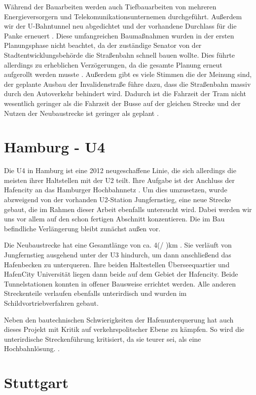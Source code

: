 Während der Bauarbeiten werden auch Tiefbauarbeiten von mehreren
Energieversorgern und Telekomunikationsunternemen
durchgeführt. Außerdem wir der U-Bahntunnel neu abgedichtet und
der vorhandene Durchlass für die Panke
erneuert \cite{flyerInvalidestr}. Diese umfangreichen Baumaßnahmen
wurden in der ersten Planungsphase nicht beachtet, da der zuständige
Senator von der Stadtentwicklungsbehörde die Straßenbahn schnell bauen
wollte. Dies führte allerdings zu erheblichen Verzögerungen, da die
gesamte Planung erneut aufgerollt werden
musste \cite{bzSchnell}. Außerdem gibt es viele Stimmen die der Meinung
sind, der geplante Ausbau der Invalidenstraße führe dazu, dass die
Straßenbahn massiv durch den Autoverkehr behindert wird. Dadurch ist
die Fahrzeit der Tram nicht wesentlich geringer als die Fahrzeit der
Busse auf der gleichen Strecke und der Nutzen der Neubaustrecke ist
geringer als geplant \cite{protram}.

\section[Hamburg]{Hamburg - U4}

Die U4 in Hamburg ist eine 2012 neugeschaffene Linie, die sich allerdings die
meisten ihrer Haltstellen mit der U2 teilt. Ihre Aufgabe ist der Anchluss der
Hafencity an das Hamburger Hochbahnnetz \cite{keuHH}. Um dies umzusetzen, wurde
abzweigend von der vorhanden U2-Station Jungfernstieg, eine neue Strecke gebaut,
die im Rahmen dieser Arbeit ebenfalls untersucht wird. Dabei werden wir uns vor
allem auf den schon fertigen Abschnitt konzentieren. Die im Bau befindliche
Verlängerung bleibt zunächst außen vor.

Die Neubaustrecke hat eine Gesamtlänge von ca. 4(/ )km \cite{keuHH}. Sie verläuft
von Jungfernstieg ausgehend unter der U3 hindurch, um dann anschließend das
Hafenbecken zu unterqueren. Ihre beiden Haltestellen Überseequartier und
HafenCity Universität liegen dann beide auf dem Gebiet der Hafencity. Beide
Tunnelstationen konnten in offener Bausweise errichtet werden. Alle anderen
Streckenteile verlaufen ebenfalls unterirdisch und wurden im
Schildvortriebverfahren gebaut.

Neben den bautechnischen Schwierigkeiten der Hafenunterquerung hat auch dieses
Projekt mit Kritik auf verkehrspolitscher Ebene zu kämpfen. So wird die
unterirdische Streckenführung kritisiert, da sie teurer sei, als eine
Hochbahnlösung. \cite{hamburgerAbendblattu4}.

\section{Stuttgart}

